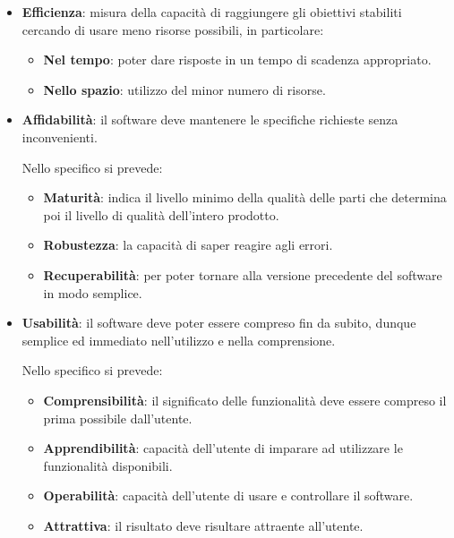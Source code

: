 \begin{itemize}
			\item \textbf{Efficienza}: misura della capacità di raggiungere gli obiettivi stabiliti cercando di usare meno risorse possibili, in particolare:
			
			\begin{itemize}
				\item \textbf{Nel tempo}: poter dare risposte in un tempo di scadenza appropriato.
				\item \textbf{Nello spazio}: utilizzo del minor numero di risorse.
			\end{itemize}
		
			\item \textbf{Affidabilità}: il software deve mantenere le specifiche richieste senza inconvenienti.
			
			Nello specifico si prevede:
			
			\begin{itemize}
				\item \textbf{Maturità}: indica il livello minimo della qualità delle parti che determina poi il livello di qualità dell'intero prodotto.
				\item \textbf{Robustezza}: la capacità di saper reagire agli errori.
				\item \textbf{Recuperabilità}: per poter tornare alla versione precedente del software in modo semplice.
			\end{itemize}
		
			\item \textbf{Usabilità}: il software deve poter essere compreso fin da subito, dunque semplice ed immediato nell'utilizzo e nella comprensione.
			
			Nello specifico si prevede:
			
			\begin{itemize}
				\item \textbf{Comprensibilità}: il significato delle funzionalità deve essere compreso il prima possibile dall'utente.
				\item \textbf{Apprendibilità}: capacità dell'utente di imparare ad utilizzare le funzionalità disponibili.
				\item \textbf{Operabilità}: capacità dell'utente di usare e controllare il software.
				\item \textbf{Attrattiva}: il risultato deve risultare attraente all'utente.
			\end{itemize}
		\end{itemize}
	

